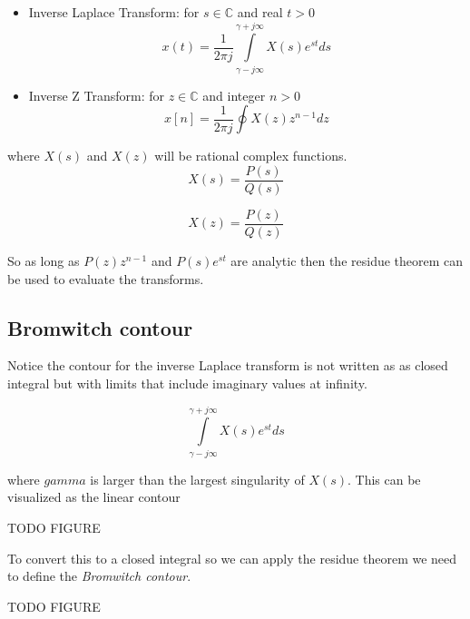 \documentclass{article}
\begin{document}
\begin{itemize}
\item Inverse Laplace Transform: for $s\in\mathbb{C}$ and real $t > 0$
  \[
  x(t) = \frac{1}{2\pi j} \int\limits_{\gamma -j\infty}^{\gamma + j\infty} X(s) e^{st} ds
  \]
\item Inverse Z Transform: for $z\in\mathbb{C}$ and integer $n > 0$
  \[
  x[n] = \frac{1}{2\pi j} \oint X(z) z^{n-1} dz
  \]
\end{itemize}

where $X(s)$ and $X(z)$ will be rational complex functions.
\[
X(s) = \frac{P(s)}{Q(s)}
\]

\[
X(z) = \frac{P(z)}{Q(z)}
\]

So as long as $P(z) z^{n-1}$ and $P(s) e^{st}$ are analytic then the residue theorem can be used to evaluate the transforms.

\subsection{Bromwitch contour}

Notice the contour for the inverse Laplace transform is not written as as closed integral but with limits that include imaginary values at infinity.

\[
\int\limits_{\gamma -j\infty}^{\gamma + j\infty} X(s) e^{st} ds
\]

where $gamma$ is larger than the largest singularity of $X(s)$. This can be visualized as the linear contour

TODO FIGURE

To convert this to a closed integral so we can apply the residue theorem we need to define the \textit{Bromwitch contour}.

TODO FIGURE
\end{document}
